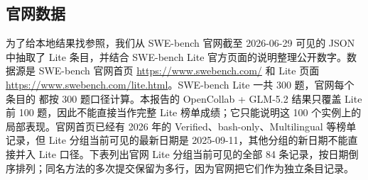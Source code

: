 \documentclass[UTF8,a4paper,11pt]{ctexart}
\begin{document}
\subsection{官网数据}
为了给本地结果找参照，我们从 SWE-bench 官网截至 2026-06-29 可见的  JSON 中抽取了 Lite 条目，并结合 SWE-bench Lite 官方页面的说明整理公开数字。数据源是 SWE-bench 官网首页 \url{https://www.swebench.com/} 和 Lite 页面 \url{https://www.swebench.com/lite.html}。SWE-bench Lite 一共 300 题，官网每个条目的  都按 300 题口径计算。本报告的 OpenCollab + GLM-5.2 结果只覆盖 Lite 前 100 题，因此不能直接当作完整 Lite 榜单成绩；它只能说明这 100 个实例上的局部表现。官网首页已经有 2026 年的 Verified、bash-only、Multilingual 等榜单记录，但 Lite 分组当前可见的最新日期是 2025-09-11，其他分组的新日期不能直接并入 Lite 口径。下表列出官网 Lite 分组当前可见的全部 84 条记录，按日期倒序排列；同名方法的多次提交保留为多行，因为官网把它们作为独立条目记录。
\end{document}
